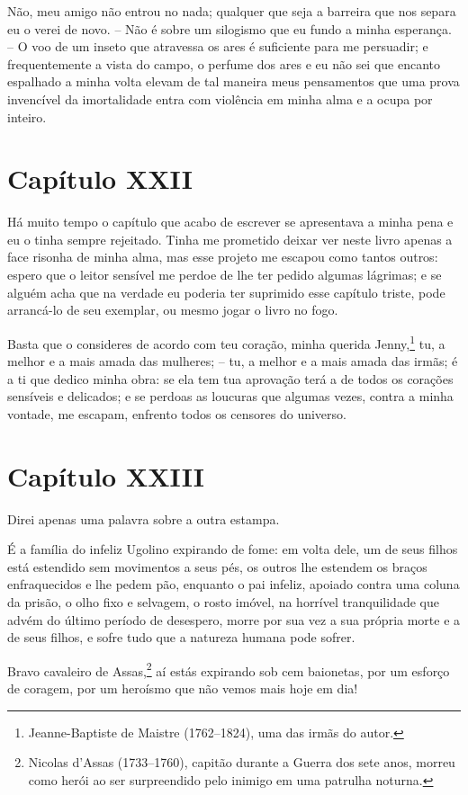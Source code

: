  Não, meu amigo não entrou no nada; qualquer que seja a barreira que nos
separa eu o verei de novo. -- Não é sobre um silogismo que eu fundo a
minha esperança. -- O voo de um inseto que atravessa os ares é
suficiente para me persuadir; e frequentemente a vista do campo, o
perfume dos ares e eu não sei que encanto espalhado a minha volta
elevam de tal maneira meus pensamentos que uma prova invencível da
imortalidade entra com violência em minha alma e a ocupa por inteiro.

\section*{Capítulo XXII}

Há muito tempo o capítulo que acabo de escrever se apresentava a minha
pena e eu o tinha sempre rejeitado. Tinha me prometido deixar ver neste
livro apenas a face risonha de minha alma, mas esse projeto me escapou
como tantos outros: espero que o leitor sensível me perdoe de lhe ter
pedido algumas lágrimas; e se alguém acha que na verdade eu poderia ter
suprimido esse capítulo triste, pode arrancá-lo de seu exemplar, ou
mesmo jogar o livro no fogo. 

Basta que o consideres de acordo com teu coração, minha querida
Jenny,\footnote{ Jeanne-Baptiste de Maistre (1762--1824), uma das irmãs
do autor.} tu, a melhor e a mais amada das mulheres; -- tu, a
melhor e a mais amada das irmãs; é a ti que dedico minha obra: se ela
tem tua aprovação terá a de todos os corações sensíveis e delicados; e
se perdoas as loucuras que algumas vezes, contra a minha vontade, me
escapam, enfrento todos os censores do universo. 

\section*{Capítulo XXIII}

 Direi apenas uma palavra sobre a outra estampa.

 É a família do infeliz Ugolino expirando de fome: em volta dele, um de
seus filhos está estendido sem movimentos a seus pés, os outros lhe
estendem os braços enfraquecidos e lhe pedem pão, enquanto o pai
infeliz, apoiado contra uma coluna da prisão, o olho fixo e selvagem, o
rosto imóvel, na horrível tranquilidade que advém do último período de
desespero, morre por sua vez a sua própria morte e a de seus filhos, e
sofre tudo que a natureza humana pode sofrer.

 Bravo cavaleiro de Assas,\footnote{ Nicolas d’Assas (1733--1760), capitão
durante a Guerra dos sete anos, morreu como herói ao ser surpreendido pelo
inimigo em uma patrulha noturna.} aí estás expirando sob cem
baionetas, por um esforço de coragem, por um heroísmo que não vemos
mais hoje em dia!

